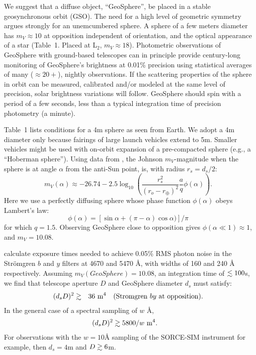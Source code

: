 \documentclass[useAMS,usenatbib]{mn2e}
\newcommand{\highlight}{\color{red} }
\renewcommand{\highlight}{}
\newcommand{\be}[1]{\begin{equation} \label{eq:#1}}
\newcommand{\ee}{\end{equation}}
\newcommand\lta { \mathrel {\hbox to 0pt {\lower 3.7pt \hbox{$\sim$}
      \hss} \raise 1.7pt \hbox{$<$}}}
\newcommand\gta { \mathrel {\hbox to 0pt {\lower 3.7pt \hbox{$\sim$}
      \hss} \raise 1.7pt \hbox{$>$}}}
\newcommand\name{LAMBERT}
\renewcommand\name{GeoSphere}
\begin{document}
We suggest that a diffuse object, ``\name{}'', be placed in a
stable geosynchronous orbit (GSO).  
{\highlight The need for a high level of geometric symmetry argues strongly for an
unemcumbered sphere.  }
A sphere of a few
meters diameter has $m_V\approx 10$ at opposition independent of
orientation, and
the optical appearance of a star (Table~1. Placed at L$_2$, $m_V\approx 18$). 
Photometric observations of \name{}
with ground-based telescopes can in 
principle provide century-long monitoring of \name{}'s brightness at
0.01\% precision \citep{Young+others1991,Henry1999} using statistical
averages of many ($\approx 20+$), nightly observations.   
If the scattering properties of the sphere in orbit can 
be measured, calibrated and/or modeled at the same level of precision, 
solar brightness variations will follow.  
\name{} should spin with a period of a few seconds, less than
a typical integration time of precision photometry (a minute).  

Table~1 lists conditions for a 4m sphere as seen from Earth.
We adopt a 4m diameter only because fairings of large launch vehicles 
extend to 5m. Smaller vehicles might be used 
with on-orbit expansion of a pre-compacted sphere (e.g., a ``Hoberman sphere''). 
Using data from \cite{Allen1973}, the
Johnson $m_V$-magnitude when the sphere is at angle $\alpha$ from the
anti-Sun point, is, with radius $r_s=d_s/2$:
%
\be{v} m_V(\alpha) \approx - 26.74 - 2.5
\log_{10} \left (\frac { r_s^2 }{(r_o-r_\oplus)^2} \frac{a}{q}
\phi(\alpha) \right).  \ee 
%
Here we use a perfectly diffusing sphere
whose phase function $\phi(\alpha)$  obeys Lambert's law: 
%
\be{lambert} \phi(\alpha) = \left [ \sin
  \alpha + (\pi-\alpha) \cos \alpha) \right ] / \pi 
\ee 
%
for which $q=1.5$.  Observing \name{} close to
opposition gives $\phi(\alpha \ll 1)\approx1$, and  $m_V = 10.08$.

\citet[][their table 1]{Young+others1991} calculate 
exposure times
needed to achieve 0.05\% RMS photon noise
in the Str\"omgren $b$ and $y$ filters 
at 4670 and 5470 \AA{}, with 
widths of 160 and 240 \AA{} respectively.
Assuming $m_V(\name)=10.08$, 
an integration time of $\lta 100$s, we find that 
telescope aperture $D$ and \name{} diameter $d_s$ must satisfy:
\begin{eqnarray}
(d_s D)^2 &\gta &36 {\rm \ m^4} \ \ \ {\rm (Stromgren}~by~{\rm at~opposition).}
\end{eqnarray}
In the general case of a spectral sampling of $w$ \AA, 
\be{spectra} \nonumber
(d_s D)^2 \gta 5800/w {\rm \ m^4}. \ \ \ 
\ee
%
For observations with the $w=10$\AA{} sampling of the SORCE-SIM
instrument \citep{Harder+others2000} for example, then $d_s=4$m and 
$D\gta 6$m.
\end{document}
